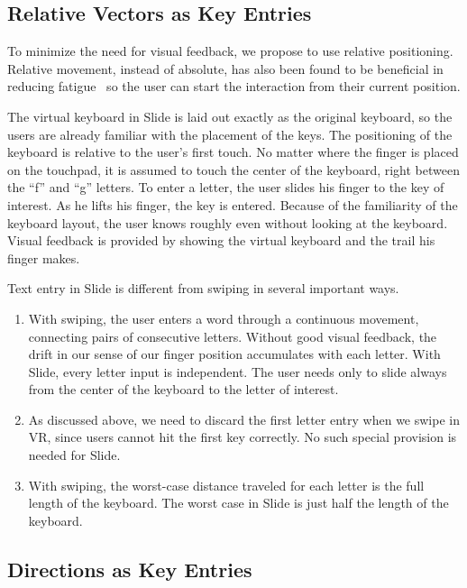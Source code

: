 \subsection{Relative Vectors as Key Entries}

To minimize the need for visual feedback, we propose to use relative positioning.  Relative movement, instead of absolute, has also been found to be beneficial in reducing fatigue~\cite{Hincapie-Ramos:2014:CEM:2556288.2557130} so the user can start the interaction from their current position. 

The virtual keyboard in Slide is laid out exactly as the original keyboard, so the users are already familiar with the placement of the keys.   The positioning of the keyboard is relative to the user's first touch.  No matter where the finger is placed on the touchpad, it is assumed to touch the center of the keyboard, right between the ``f'' and ``g'' letters.  To enter a letter, the user slides his finger to the key of interest.  As he lifts his finger, the key is entered.  Because of the familiarity of the keyboard layout, the user knows roughly even without looking at the keyboard.  Visual feedback is provided by showing the virtual keyboard and the trail his finger makes.   

Text entry in Slide is different from swiping in several important ways. 
\begin{enumerate}
\item
With swiping, the user enters a word through a continuous movement, connecting pairs of consecutive letters.  Without good visual feedback, the drift in our sense of our finger position accumulates with each letter.   With Slide, every letter input is independent.  The user needs only to slide always from the center of the keyboard to the letter of interest.  

\item 
As discussed above, we need to discard the first letter entry when we swipe in VR, since users cannot hit the first key correctly.   No such special provision is needed for Slide.

\item
With swiping, the worst-case distance traveled for each letter is the full length of the keyboard.  The worst case in Slide is just half the length of the keyboard. 
\end{enumerate}


\subsection{Directions as Key Entries}

